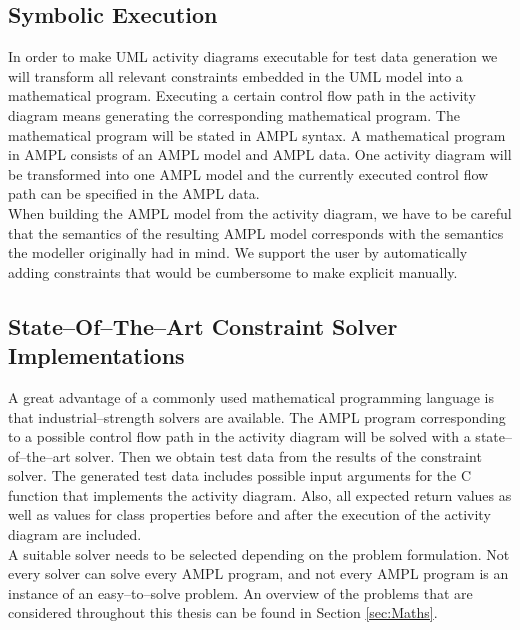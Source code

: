 \subsection{Symbolic Execution}
In order to make UML activity diagrams executable for test data generation we will transform all relevant constraints embedded in the UML model into a mathematical program. Executing a certain control flow path in the activity diagram means generating the corresponding mathematical program. The mathematical program will be stated in AMPL syntax. A mathematical program in AMPL consists of an AMPL model and AMPL data. One activity diagram will be transformed into one AMPL model and the currently executed control flow path can be specified in the AMPL data.\\
When building the AMPL model from the activity diagram, we have to be careful that the semantics of the resulting AMPL model corresponds with the semantics the modeller originally had in mind. We support the user by automatically adding constraints that would be cumbersome to make explicit manually.
\subsection{State--Of--The--Art Constraint Solver Implementations} 
A great advantage of a commonly used mathematical programming language is that industrial--strength solvers are available. The AMPL program corresponding to a possible control flow path in the activity diagram will be solved with a state--of--the--art solver. Then we obtain test data from the results of the constraint solver. The generated test data includes possible input arguments for the C function that implements the activity diagram. Also, all expected return values as well as values for class properties before and after the execution of the activity diagram are included.\\
A suitable solver needs to be selected depending on the problem formulation. Not every solver can solve every AMPL program, and not every AMPL program is an instance of an easy--to--solve problem. An overview of the problems that are considered throughout this thesis can be found in Section \ref{sec:Maths}.
